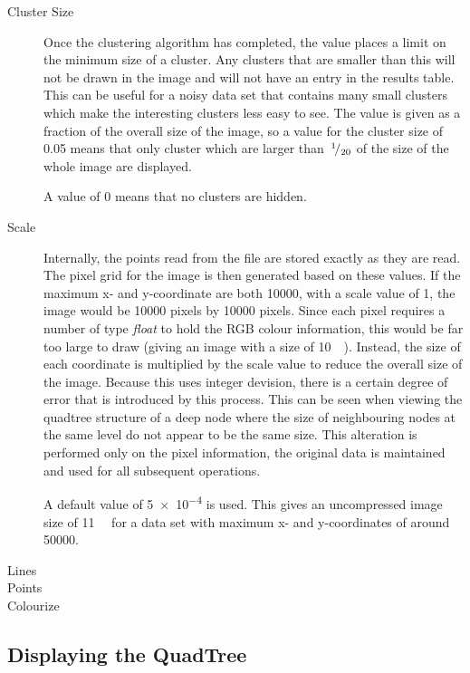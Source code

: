 \begin{description}
	\item[Cluster Size] Once the clustering algorithm has completed, the value
		places a limit on the minimum size of a cluster. Any clusters that are
		smaller than this will not be drawn in the image and will not have an
		entry in the results table. This can be useful for a noisy data set
		that contains many small clusters which make the interesting clusters
		less easy to see. The value is given as a fraction of the overall size
		of the image, so a value for the cluster size of 0.05 means that only
		cluster which are larger than~${}^{1}\!/_{20}$ of the size of the whole
		image are displayed.

		A value of 0 means that no clusters are hidden.

	\item[Scale] Internally, the points read from the file are stored exactly
		as they are read. The pixel grid for the image is then generated based
		on these values. If the maximum x- and y-coordinate are both
		\num{10000}, with a scale value of 1, the image would be \num{10000}
		pixels by \num{10000} pixels. Since each pixel requires a number of
		type \emph{float} to hold the RGB colour information, this would be far
		too large to draw (giving an image with a size of
		\SI{10}{\giga\byte}). Instead, the size of each coordinate is
		multiplied by the scale value to reduce the overall size of the image.
		Because this uses integer devision, there is a certain degree of error
		that is introduced by this process. This can be seen when viewing the
		quadtree structure of a deep node where the size of neighbouring nodes
		at the same level do not appear to be the same size. This alteration is
		performed only on the pixel information, the original data is
		maintained and used for all subsequent operations.

		A default value of \num{5e-4} is used. This gives an uncompressed image
		size of \SI{11}{\mega\byte} for a data set with maximum x- and
		y-coordinates of around \num{50000}.

	\item[Lines] %
	\item[Points] %
	\item[Colourize] %
\end{description}

\subsection{Displaying the QuadTree}
\label{sub:displaying_the_quadtree}


